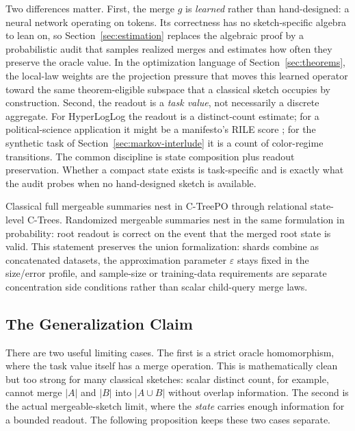 Two differences matter. First, the merge $g$ is \emph{learned} rather than
hand-designed: a neural network operating on tokens. Its correctness has no
sketch-specific algebra to lean on, so Section~\ref{sec:estimation} replaces the
algebraic proof by a probabilistic audit that samples realized merges and
estimates how often they preserve the oracle value. In the optimization
language of Section~\ref{sec:theorems}, the local-law weights are the
projection pressure that moves this learned operator toward the same
theorem-eligible subspace that a classical sketch occupies by construction.
Second, the readout is a \emph{task value}, not necessarily a discrete
aggregate. For HyperLogLog the readout is a distinct-count estimate; for a
political-science application it might be a manifesto's RILE score
\citep{BenoitEtAl2025,ManifestoProject2025a}; for the synthetic task of
Section~\ref{sec:markov-interlude} it is a count of color-regime transitions.
The common discipline is state composition plus readout preservation. Whether
a compact state exists is task-specific and is exactly what the audit probes
when no hand-designed sketch is available.

Classical full mergeable summaries nest in C-TreePO through relational
state-level C-Trees. Randomized mergeable summaries nest in the same
formulation in probability: root readout is correct on the event that the
merged root state is valid. This statement preserves the union
formalization: shards combine as concatenated datasets, the approximation
parameter $\varepsilon$ stays fixed in the size/error profile, and
sample-size or training-data requirements are separate concentration
side conditions rather than scalar child-query merge laws.

\subsection{The Generalization Claim}

There are two useful limiting cases. The first is a strict oracle
homomorphism, where the task value itself has a merge operation. This is
mathematically clean but too strong for many classical sketches: scalar
distinct count, for example, cannot merge $|A|$ and $|B|$ into $|A\cup B|$
without overlap information. The second is the actual mergeable-sketch limit,
where the \emph{state} carries enough information for a bounded readout. The
following proposition keeps these two cases separate.

